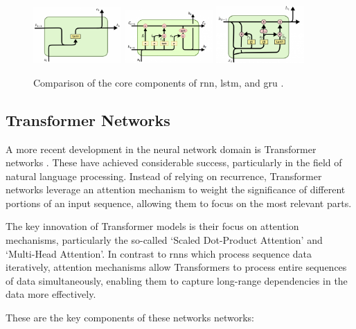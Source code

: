 \begin{figure}[H]
	\includegraphics[width=0.3\textwidth]{files/RNN_Core2-768x491.png}
	\includegraphics[width=0.3\textwidth]{files/LSTM-Core-768x466.png}
	\includegraphics[width=0.3\textwidth]{files/GRU-768x502.png}
	\caption{Comparison of the core components of \gls{rnn}, \gls{lstm}, and \gls{gru} \citep{http://dprogrammer.org}.}
\end{figure}

\subsection{Transformer Networks}

A more recent development in the neural network domain is Transformer networks
\citep{attention:2017}. These have achieved considerable success, particularly
in the field of natural language processing. Instead of relying on recurrence,
Transformer networks leverage an attention mechanism to weight the significance
of different portions of an input sequence, allowing them to focus on the most
relevant parts.

The key innovation of Transformer models is their focus on attention
mechanisms, particularly the so-called `Scaled Dot-Product Attention' and
`Multi-Head Attention'. In contrast to \glspl{rnn} which process sequence data
iteratively, attention mechanisms allow Transformers to process entire
sequences of data simultaneously, enabling them to capture long-range
dependencies in the data more effectively.

These are the key components of these networks networks:

